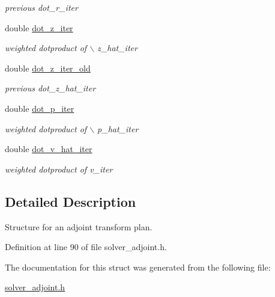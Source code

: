 \begin{CompactItemize}
\begin{CompactList}\small\item\em previous dot\_\-r\_\-iter \item\end{CompactList}\item 
\hypertarget{structinfst__adjoint__plan_2309d1161fdf96711f3251e41a65eef0}{
double \hyperlink{structinfst__adjoint__plan_2309d1161fdf96711f3251e41a65eef0}{dot\_\-z\_\-iter}}
\label{structinfst__adjoint__plan_2309d1161fdf96711f3251e41a65eef0}

\begin{CompactList}\small\item\em weighted dotproduct of $\backslash$ z\_\-hat\_\-iter \item\end{CompactList}\item 
\hypertarget{structinfst__adjoint__plan_9bdd6b4dfcb1b22bd010444ef34b5903}{
double \hyperlink{structinfst__adjoint__plan_9bdd6b4dfcb1b22bd010444ef34b5903}{dot\_\-z\_\-iter\_\-old}}
\label{structinfst__adjoint__plan_9bdd6b4dfcb1b22bd010444ef34b5903}

\begin{CompactList}\small\item\em previous dot\_\-z\_\-hat\_\-iter \item\end{CompactList}\item 
\hypertarget{structinfst__adjoint__plan_6dfb17d6feade963b31c16e6278aa6ee}{
double \hyperlink{structinfst__adjoint__plan_6dfb17d6feade963b31c16e6278aa6ee}{dot\_\-p\_\-iter}}
\label{structinfst__adjoint__plan_6dfb17d6feade963b31c16e6278aa6ee}

\begin{CompactList}\small\item\em weighted dotproduct of $\backslash$ p\_\-hat\_\-iter \item\end{CompactList}\item 
\hypertarget{structinfst__adjoint__plan_b4e8f85dfe25ba2b90f86d7d39362e5c}{
double \hyperlink{structinfst__adjoint__plan_b4e8f85dfe25ba2b90f86d7d39362e5c}{dot\_\-v\_\-hat\_\-iter}}
\label{structinfst__adjoint__plan_b4e8f85dfe25ba2b90f86d7d39362e5c}

\begin{CompactList}\small\item\em weighted dotproduct of v\_\-iter \item\end{CompactList}\end{CompactItemize}


\subsection{Detailed Description}
Structure for an adjoint transform plan. 

Definition at line 90 of file solver\_\-adjoint.h.

The documentation for this struct was generated from the following file:\begin{CompactItemize}
\item 
\hyperlink{solver__adjoint_8h}{solver\_\-adjoint.h}\end{CompactItemize}
